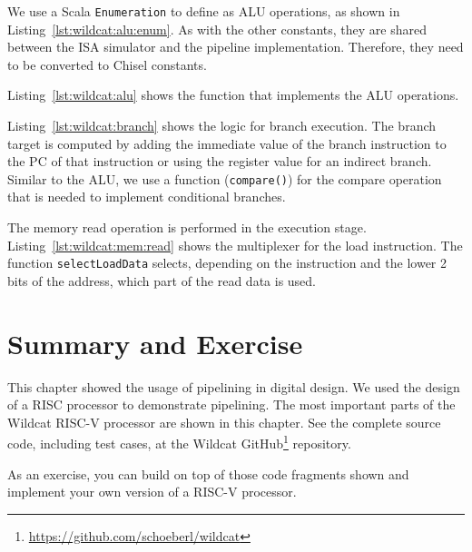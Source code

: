 \documentclass[%
    10pt,
    headinclude, footexclude,
    openright, %
    notitlepage,
    cleardoubleempty,
    headsepline,
    pointlessnumbers,
    bibtotoc, idxtotoc,
    ]{scrbook}
\newcommand{\code}[1]{{\lstinline[basicstyle=\small\ttfamily]{#1}}}
\newcommand{\myref}[2]{\href{#1}{#2}}
\renewcommand{\myref}[2]{{#2}{\footnote{\url{#1}}}}
\begin{document}

We use a Scala \code{Enumeration} to define as ALU operations, as shown
in Listing~\ref{lst:wildcat:alu:enum}. As with the other constants, they are shared between the
ISA simulator and the pipeline implementation. Therefore, they need to be converted
to Chisel constants.

Listing~\ref{lst:wildcat:alu} shows the function that implements the ALU operations.



Listing~\ref{lst:wildcat:branch} shows the logic for branch execution.
The branch target is computed by adding the immediate value of the branch instruction
to the PC of that instruction or using the register value for an indirect branch.
Similar to the ALU, we use a function (\code{compare()}) for the compare operation
that is needed to implement conditional branches.




The memory read operation is performed in the execution stage.
Listing~\ref{lst:wildcat:mem:read} shows the multiplexer for the load instruction.
The function \code{selectLoadData} selects, depending on the instruction and
the lower 2 bits of the address, which part of the read data is used. 




\section{Summary and Exercise}

This chapter showed the usage of pipelining in digital design. We used the
design of a RISC processor to demonstrate pipelining. The most important
parts of the Wildcat RISC-V processor are shown in this chapter.
See the complete source code, including test cases, at the
\myref{https://github.com/schoeberl/wildcat}{Wildcat GitHub} repository.

As an exercise, you can build on top of those code fragments shown and implement
your own version of a RISC-V processor. 
\end{document}
